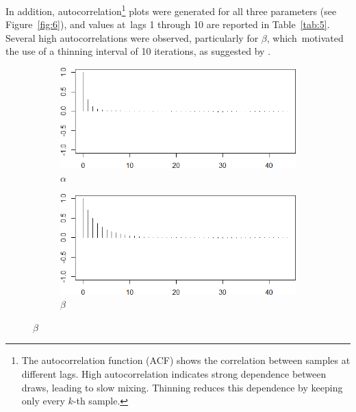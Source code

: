 \documentclass{Class/julia}
\begin{document}
In addition, autocorrelation\footnote{The autocorrelation function (ACF) shows the correlation between samples at different lags. High autocorrelation indicates strong dependence between draws, leading to slow mixing. Thinning reduces this dependence by keeping only every \( k \)-th sample.} plots were generated for all three parameters (see Figure~\ref{fig:6}), and values at~lags 1 through 10 are reported in Table~\ref{tab:5}. Several high autocorrelations were observed, particularly for \( \beta \), which~motivated the use of a thinning interval of 10 iterations, as suggested by \citet{dudley2006bayesian}.

\begin{figure}[!ht]
    \centering
    \caption{Autocorrelation Plots}
    \label{fig:6}
    \begin{subfigure}{0.45\textwidth}
        \centering
        \includegraphics[width=\textwidth]{rytgaard1990/acf_alpha.png}
        \caption{\( \alpha \)}
    \end{subfigure}
    \hfill
    \begin{subfigure}{0.45\textwidth}
        \centering
        \includegraphics[width=\textwidth]{rytgaard1990/acf_beta.png}
        \caption{\( \beta \)}
    \end{subfigure}

    \vspace{1em}


\end{figure}
\end{document}
